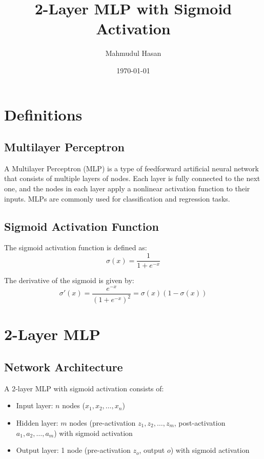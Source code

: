 \documentclass[12pt]{article}
\title{2-Layer MLP with Sigmoid Activation}
\author{Mahmudul Hasan}
\date{\today}
\begin{document}
\maketitle


\section{Definitions}

\subsection{Multilayer Perceptron}
A Multilayer Perceptron (MLP) is a type of feedforward artificial neural network that consists of multiple layers of nodes. Each layer is fully connected to the next one, and the nodes in each layer apply a nonlinear activation function to their inputs. MLPs are commonly used for classification and regression tasks.

\subsection{Sigmoid Activation Function}
The sigmoid activation function is defined as:
\[\sigma(x) = \frac{1}{1 + e^{-x}} \]

The derivative of the sigmoid is given by:
\[\sigma'(x) = \frac{e^{-x}}{(1 + e^{-x})^2} = \sigma(x)\left(1 - \sigma(x)\right)\]

\section{2-Layer MLP}
\subsection{Network Architecture}

A 2-layer MLP with sigmoid activation consists of:
\begin{itemize}
    \item Input layer: $n$ nodes ($x_1, x_2, \ldots, x_n$)
    \item Hidden layer: $m$ nodes (pre-activation $z_1, z_2, \ldots, z_m$, post-activation $a_1, a_2, \ldots, a_m$) with sigmoid activation
    \item Output layer: 1 node (pre-activation $z_o$, output $o$) with sigmoid activation
\end{itemize}
\end{document}

